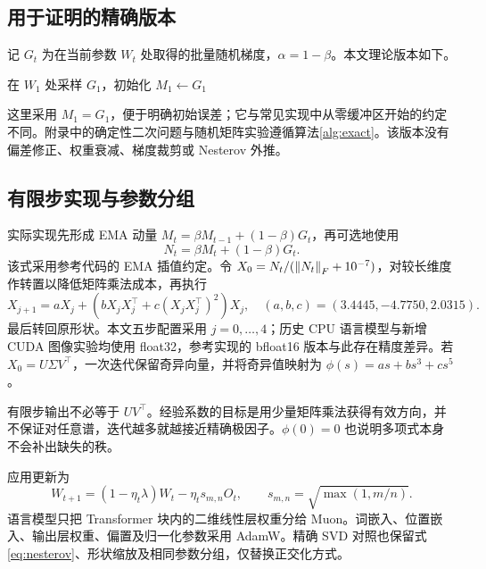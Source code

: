 \subsection{用于证明的精确版本}
记 $G_t$ 为在当前参数 $W_t$ 处取得的批量随机梯度，$\alpha=1-\beta$。本文理论版本如下。
\begin{algorithm}[htbp]
\caption{精确极因子 Muon：本文的理论分析对象}\label{alg:exact}
在 $W_1$ 处采样 $G_1$，初始化 $M_1\leftarrow G_1$\;
\end{algorithm}

这里采用 $M_1=G_1$，便于明确初始误差；它与常见实现中从零缓冲区开始的约定不同。附录中的确定性二次问题与随机矩阵实验遵循算法\ref{alg:exact}。该版本没有偏差修正、权重衰减、梯度裁剪或 Nesterov 外推。

\subsection{有限步实现与参数分组}
实际实现先形成 EMA 动量 $M_t=\beta M_{t-1}+(1-\beta)G_t$，再可选地使用
\begin{equation}\label{eq:nesterov}
 N_t=\beta M_t+(1-\beta)G_t.
\end{equation}
该式采用参考代码的 EMA 插值约定。令 $X_0=N_t/(\left\lVert N_t\right\rVert_F+10^{-7})$，对较长维度作转置以降低矩阵乘法成本，再执行
\begin{equation}\label{eq:ns}
 X_{j+1}=aX_j+(bX_jX_j^\top+c(X_jX_j^\top)^2)X_j,
 \quad (a,b,c)=(3.4445,-4.7750,2.0315).
\end{equation}
最后转回原形状。本文五步配置采用 $j=0,\ldots,4$；历史 CPU 语言模型与新增 CUDA 图像实验均使用 float32，参考实现的 bfloat16 版本与此存在精度差异。若 $X_0=U\Sigma V^\top$，一次迭代保留奇异向量，并将奇异值映射为 $\phi(s)=as+bs^3+cs^5$。

有限步输出不必等于 $UV^\top$。经验系数的目标是用少量矩阵乘法获得有效方向，并不保证对任意谱，迭代越多就越接近精确极因子。$\phi(0)=0$ 也说明多项式本身不会补出缺失的秩。

应用更新为
\begin{equation}\label{eq:practical}
 W_{t+1}=(1-\eta_t\lambda)W_t-\eta_t s_{m,n}O_t,
 \qquad s_{m,n}=\sqrt{\max(1,m/n)}.
\end{equation}
语言模型只把 Transformer 块内的二维线性层权重分给 Muon。词嵌入、位置嵌入、输出层权重、偏置及归一化参数采用 AdamW。精确 SVD 对照也保留式\eqref{eq:nesterov}、形状缩放及相同参数分组，仅替换正交化方式。

